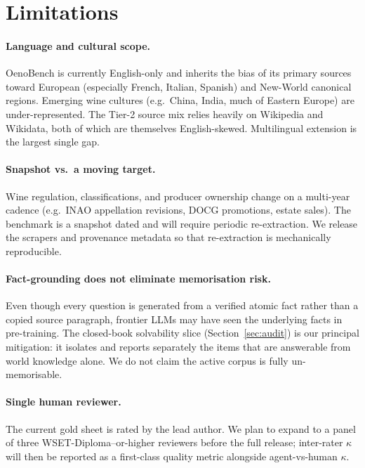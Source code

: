 \section{Limitations}
\label{sec:limitations}

\paragraph{Language and cultural scope.} OenoBench is currently English-only and inherits the bias of its primary sources toward European (especially French, Italian, Spanish) and New-World canonical regions. Emerging wine cultures (e.g.\ China, India, much of Eastern Europe) are under-represented. The Tier-2 source mix relies heavily on Wikipedia and Wikidata, both of which are themselves English-skewed. Multilingual extension is the largest single gap.

\paragraph{Snapshot vs.\ a moving target.} Wine regulation, classifications, and producer ownership change on a multi-year cadence (e.g.\ INAO appellation revisions, DOCG promotions, estate sales). The benchmark is a snapshot dated  and will require periodic re-extraction. We release the scrapers and provenance metadata so that re-extraction is mechanically reproducible.

\paragraph{Fact-grounding does not eliminate memorisation risk.} Even though every question is generated from a verified atomic fact rather than a copied source paragraph, frontier LLMs may have seen the underlying facts in pre-training. The closed-book solvability slice (Section~\ref{sec:audit}) is our principal mitigation: it isolates and reports separately the items that are answerable from world knowledge alone. We do not claim the active corpus is fully un-memorisable.

\paragraph{Single human reviewer.} The current gold sheet is rated by the lead author. We plan to expand to a panel of three WSET-Diploma--or-higher reviewers before the full release; inter-rater $\kappa$ will then be reported as a first-class quality metric alongside agent-vs-human $\kappa$.

